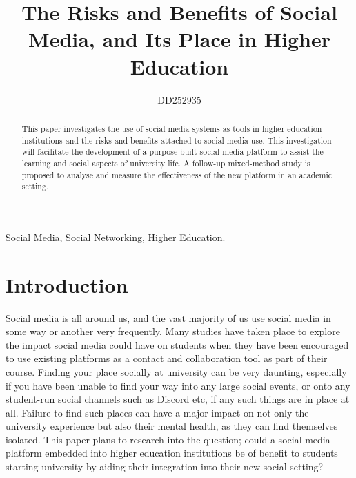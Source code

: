 \documentclass[lettersize,journal]{IEEEtran}
\begin{document}
\title{The Risks and Benefits of Social Media, and Its Place in Higher Education}

\author{DD252935}




\maketitle

\begin{abstract}
        This paper investigates the use of social media systems as tools in higher education
        institutions and the risks and benefits attached to social media use. This investigation will
        facilitate the development of a purpose-built social media platform to assist the learning and social
        aspects of university life. A follow-up mixed-method study is proposed to analyse and measure the effectiveness of
        the new platform in an academic setting.
\end{abstract}





\begin{IEEEkeywords}
Social Media, Social Networking, Higher Education.
\end{IEEEkeywords}

\section{Introduction}
        Social media is all around us, and the vast majority of us use social media in some way or another very
        frequently. Many studies have taken place to explore the impact social media could have on students
        when they have been encouraged to use existing platforms as a contact and collaboration tool as part
        of their course.
    Finding your place socially at university can be very daunting, especially if you have been unable to find
    your way into any large social events, or onto any student-run social channels such as Discord \cite{Discord} etc, if any
    such things are in place at all. Failure to find such places can have a major impact on not only the university
    experience but also their mental health, as they can find themselves isolated. This paper plans to research into the
    question; could a social media platform embedded into higher education institutions be of benefit to students
    starting university by aiding their integration into their new social setting?
\end{document}
